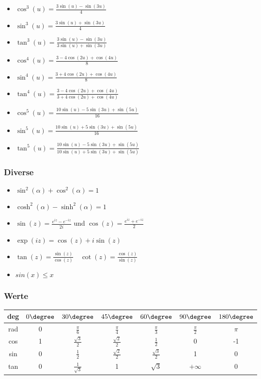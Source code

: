 \documentclass[7pt,landscape, margin = 0.1mm]{article}
\begin{document}
\begin{multicols}{4}
\begin{itemize}
\item $\cos^3(u) = \frac{3 \sin(u)-\sin(3u)}{4}$
\item $\sin^3(u) = \frac{3 \sin(u)+\sin(3u)}{4}$
\item $\tan^3(u) = \frac{3 \sin(u)-\sin(3u)}{3 \sin(u)+\sin(3u)}$ 

\item $\cos^4(u) = \frac{3- 4 \cos(2u) + \cos(4u)}{8}$
\item $\sin^4(u) = \frac{3+ 4 \cos(2u) + \cos(4u)}{8}$
\item $\tan^4(u) = \frac{3- 4 \cos(2u) + \cos(4u)}{3+4 \cos(2u) + \cos(4u)}$
 
\item $\cos^5(u) = \frac{10 \sin(u) - 5 \sin(3u)+ \sin(5u)}{16}$
\item $\sin^5(u) = \frac{10 \sin(u) + 5 \sin(3u)+ \sin(5u)}{16}$
\item $\tan^5(u) = \frac{10 \sin(u) - 5 \sin(3u)+ \sin(5u)}{10 \sin(u) + 5 \sin(3u)+ \sin(5u)}$ 
\end{itemize}

\subsubsection{Diverse}

\begin{itemize}
 \item $\sin^2(\alpha) + \cos^2(\alpha) = 1$
 \item $\cosh^2(\alpha) - \sinh^2(\alpha) = 1$
 \item $\sin(z) = \frac{e^{iz} - e^{-iz}}{2i}$ und $\cos(z) = \frac{e^{iz} + e^{-iz}}{2}$
 \item $\exp (iz) = \cos(z) + i \sin(z)$
 \item $\tan(z)=\frac{\sin(z)}{\cos(z)}\quad \cot(z)=\frac{\cos(z)}{\sin(z)}$
 \item $sin(x)\leq x$
\end{itemize}
\begin{center} 
\subsubsection{Werte}
 \begin{tabular}{c|cccccc}
  deg& $0 \degree $ & $30 \degree $ & $45 \degree $ & $60 \degree $ & $90 \degree $ & $180 \degree $ \\
  \hline
  rad & 0 & $\frac{\pi}{6}$ & $\frac{\pi}{4}$ & $\frac{\pi}{3}$ & $\frac{\pi}{2}$ & $\pi$ \\
  cos & 1 & $\frac{\sqrt{3}}{2}$ & $\frac{\sqrt{2}}{2}$ & $\frac{1}{2}$ & 0 & -1 \\
  sin & 0 & $\frac{1}{2}$ & $\frac{\sqrt{2}}{2}$ & $\frac{\sqrt{3}}{2}$ & 1 & 0 \\
  tan & 0 & $\frac{1}{\sqrt{3}}$ & 1 & $\sqrt{3}$ & $+\infty$ & 0 \\
 \end{tabular}
\end{center} 

\end{multicols}
\end{document}
